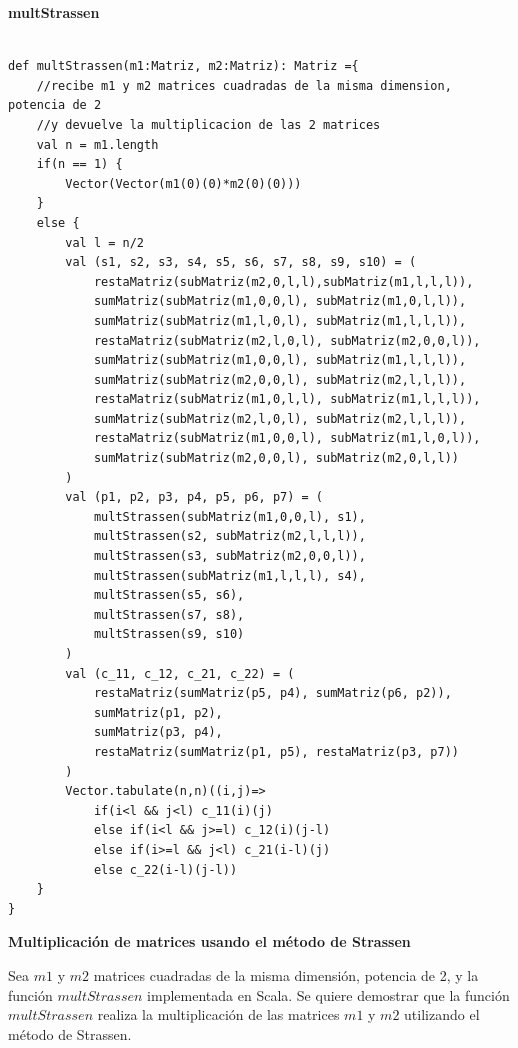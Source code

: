 \documentclass[12pt, a4paper]{article}
\begin{document}
\textbf{{multStrassen}} \\ \\
\begin{lstlisting}[caption=mult Strassen, label=lst:scala_cod10]
def multStrassen(m1:Matriz, m2:Matriz): Matriz ={
    //recibe m1 y m2 matrices cuadradas de la misma dimension, potencia de 2
    //y devuelve la multiplicacion de las 2 matrices
    val n = m1.length
    if(n == 1) {
        Vector(Vector(m1(0)(0)*m2(0)(0)))
    }
    else {           
        val l = n/2
        val (s1, s2, s3, s4, s5, s6, s7, s8, s9, s10) = (
            restaMatriz(subMatriz(m2,0,l,l),subMatriz(m1,l,l,l)),
            sumMatriz(subMatriz(m1,0,0,l), subMatriz(m1,0,l,l)),
            sumMatriz(subMatriz(m1,l,0,l), subMatriz(m1,l,l,l)),
            restaMatriz(subMatriz(m2,l,0,l), subMatriz(m2,0,0,l)),
            sumMatriz(subMatriz(m1,0,0,l), subMatriz(m1,l,l,l)),
            sumMatriz(subMatriz(m2,0,0,l), subMatriz(m2,l,l,l)),
            restaMatriz(subMatriz(m1,0,l,l), subMatriz(m1,l,l,l)),
            sumMatriz(subMatriz(m2,l,0,l), subMatriz(m2,l,l,l)),
            restaMatriz(subMatriz(m1,0,0,l), subMatriz(m1,l,0,l)),
            sumMatriz(subMatriz(m2,0,0,l), subMatriz(m2,0,l,l))
        )
        val (p1, p2, p3, p4, p5, p6, p7) = (
            multStrassen(subMatriz(m1,0,0,l), s1),
            multStrassen(s2, subMatriz(m2,l,l,l)),
            multStrassen(s3, subMatriz(m2,0,0,l)),
            multStrassen(subMatriz(m1,l,l,l), s4),
            multStrassen(s5, s6),
            multStrassen(s7, s8),
            multStrassen(s9, s10)
        )
        val (c_11, c_12, c_21, c_22) = (
            restaMatriz(sumMatriz(p5, p4), sumMatriz(p6, p2)),
            sumMatriz(p1, p2),
            sumMatriz(p3, p4),
            restaMatriz(sumMatriz(p1, p5), restaMatriz(p3, p7))
        )
        Vector.tabulate(n,n)((i,j)=>
            if(i<l && j<l) c_11(i)(j)
            else if(i<l && j>=l) c_12(i)(j-l)
            else if(i>=l && j<l) c_21(i-l)(j)
            else c_22(i-l)(j-l))
    }
}
\end{lstlisting}
\textbf{Multiplicación de matrices usando el método de Strassen}

Sea $m1$ y $m2$ matrices cuadradas de la misma dimensión, potencia de 2, y la función $multStrassen$ implementada en Scala. Se quiere demostrar que la función $multStrassen$ realiza la multiplicación de las matrices $m1$ y $m2$ utilizando el método de Strassen.
\end{document}
